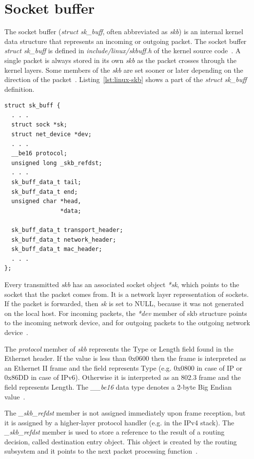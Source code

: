 
\section{Socket buffer}
The socket buffer ({\it{struct sk\_buff}}, often abbreviated as {\it{skb}}) is an internal kernel data structure that
represents an incoming or outgoing packet.
The socket buffer {\it{struct sk\_buff}} is defined in {\it{include/linux/skbuff.h}} of the kernel source code~\cite{kernel-source}.
A single packet is always stored in its own {\it{skb}}
as the packet crosses through the kernel layers.
Some members of the {\it{skb}} are set sooner or later depending on the direction of the packet~\cite{linux-kernel-networking}.
Listing~\ref{lst:linux-skb} shows a part of the {\it{struct sk\_buff}} definition.
\bigskip
\bigskip
\begin{lstlisting}[caption={Notable members of struct sk\_buff},label={lst:linux-skb}]
struct sk_buff {
  . . .
  struct sock *sk;
  struct net_device *dev;
  . . .
  __be16 protocol;
  unsigned long _skb_refdst;
  . . .
  sk_buff_data_t tail;
  sk_buff_data_t end;
  unsigned char *head,
                *data;

  sk_buff_data_t transport_header;
  sk_buff_data_t network_header;
  sk_buff_data_t mac_header;
  . . .
};
\end{lstlisting}
\bigskip
Every transmitted {\it{skb}} has an associated socket object {\it{*sk}},
which points to the socket that the packet comes from.
It is a network layer representation of sockets.
If the packet is forwarded, then {\it{sk}} is set to NULL,
because it was not generated on the local host.
For incoming packets, the {\it{*dev}} member of skb structure points to the incoming network device,
and for outgoing packets to the outgoing network device~\cite{linux-kernel-networking}.

The {\it{protocol}} member of {\it{skb}} represents the Type or Length field found in the Ethernet header.
If the value is less than 0x0600 then the frame is interpreted as an Ethernet II frame and the field represents Type
(e.g. 0x0800 in case of IP or 0x86DD in case of IPv6).
Otherwise it is interpreted as an 802.3 frame and the field represents Length.
The {\it{\_\_be16}} data type denotes a 2-byte Big Endian value~\cite{kernel-source}.

The {\it{\_skb\_refdst}} member is not assigned immediately upon frame reception,
but it is assigned by a higher-layer protocol handler (e.g. in the IPv4 stack).
The {\it{\_skb\_refdst}} member is used to store a reference to the result of a routing decision,
called destination entry object.
This object is created by the routing subsystem
and it points to the next packet processing function~\cite{linux-kernel-networking}.

